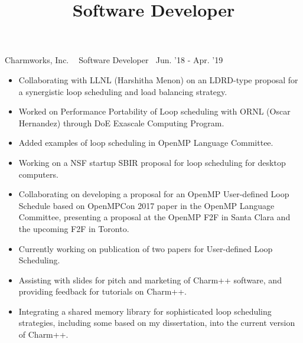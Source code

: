 \title{Software Developer}
{Charmworks, Inc. $\>$$\>$$\>$$\>$Software Developer$\>$$\>$$\>$$\>$Jun. '18 - Apr. '19}
\begin{itemize}
\item Collaborating with LLNL (Harshitha Menon) on an LDRD-type proposal for a synergistic loop scheduling and load balancing strategy. 
\item Worked on Performance Portability of Loop scheduling with ORNL (Oscar Hernandez) through DoE Exascale Computing Program.
\item Added examples of loop scheduling in OpenMP Language Committee.
\item Working on a NSF startup SBIR proposal for loop scheduling for desktop computers. 
\item Collaborating on developing a proposal for an OpenMP User-defined Loop Schedule based on OpenMPCon 2017 paper in the OpenMP Language Committee, presenting a proposal at the OpenMP F2F in Santa Clara and the upcoming F2F in Toronto. 
\item Currently working on publication of two papers for User-defined Loop Scheduling.
\item Assisting with slides for pitch and marketing of Charm++ software, and providing feedback for tutorials on Charm++. 
\item Integrating a shared memory library for sophisticated loop scheduling strategies, including some based on my dissertation, into the current version of Charm++.
\end{itemize}

